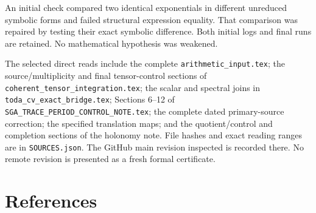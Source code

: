 \documentclass[
  11pt,
]{article}
\begin{document}
An initial check compared two identical exponentials in different
unreduced symbolic forms and failed structural expression equality. That
comparison was repaired by testing their exact symbolic difference. Both
initial logs and final runs are retained. No mathematical hypothesis was
weakened.

The selected direct reads include the complete
\texttt{arithmetic\_input.tex}; the source/multiplicity and final
tensor-control sections of \texttt{coherent\_tensor\_integration.tex};
the scalar and spectral joins in \texttt{toda\_cv\_exact\_bridge.tex};
Sections 6--12 of \texttt{SGA\_TRACE\_PERIOD\_CONTROL\_NOTE.tex}; the
complete dated primary-source correction; the specified translation
maps; and the quotient/control and completion sections of the holonomy
note. File hashes and exact reading ranges are in \texttt{SOURCES.json}.
The GitHub main revision inspected is recorded there. No remote revision
is presented as a fresh formal certificate.

\section{References}\label{references}
\end{document}
